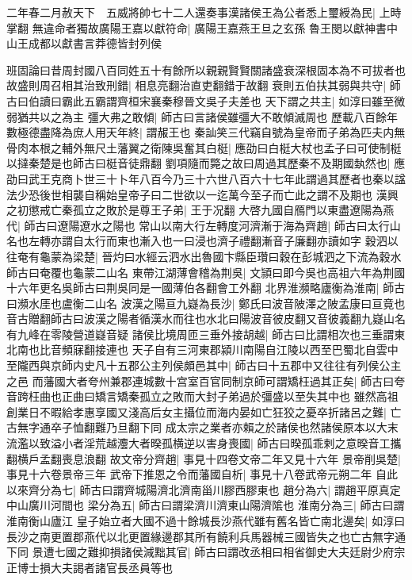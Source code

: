 二年春二月赦天下　五威將帥七十二人還奏事漢諸侯王為公者悉上璽綬為民|{
	上時掌翻}
無違命者獨故廣陽王嘉以獻符命|{
	廣陽王嘉燕王旦之玄孫}
魯王閔以獻神書中山王成都以獻書言莽德皆封列侯

班固論曰昔周封國八百同姓五十有餘所以親親賢賢關諸盛衰深根固本為不可拔者也故盛則周召相其治致刑錯|{
	相息亮翻治直吏翻錯于故翻}
衰則五伯扶其弱與共守|{
	師古曰伯讀曰霸此五霸謂齊桓宋襄秦穆晉文吳子夫差也}
天下謂之共主|{
	如淳曰雖至微弱猶共以之為主}
彊大弗之敢傾|{
	師古曰言諸侯雖彊大不敢傾滅周也}
歷載八百餘年數極德盡降為庶人用天年終|{
	謂赧王也}
秦訕笑三代竊自號為皇帝而子弟為匹夫内無骨肉本根之輔外無尺土藩翼之衛陳吳奮其白梃|{
	應劭曰白梃大杖也孟子曰可使制梃以撻秦楚是也師古曰梃音徒鼎翻}
劉項隨而斃之故曰周過其歷秦不及期國埶然也|{
	應劭曰武王克商卜世三十卜年八百今乃三十六世八百六十七年此謂過其歷者也秦以諡法少恐後世相襲自稱始皇帝子曰二世欲以一迄萬今至子而亡此之謂不及期也}
漢興之初懲戒亡秦孤立之敗於是尊王子弟|{
	王于况翻}
大啓九國自鴈門以東盡遼陽為燕代|{
	師古曰遼陽遼水之陽也}
常山以南大行左轉度河濟漸于海為齊趙|{
	師古曰太行山名也左轉亦謂自太行而東也漸入也一曰浸也濟子禮翻漸音子廉翻亦讀如字}
穀泗以往奄有龜蒙為梁楚|{
	晉灼曰水經云泗水出魯國卞縣臣瓚曰穀在彭城泗之下流為穀水師古曰奄覆也龜蒙二山名}
東帶江湖薄會稽為荆吳|{
	文頴曰即今吳也高祖六年為荆國十六年更名吳師古曰荆吳同是一國薄伯各翻會工外翻}
北界淮瀕略廬衡為淮南|{
	師古曰瀕水厓也盧衡二山名}
波漢之陽亘九嶷為長沙|{
	鄭氏曰波音陂澤之陂孟康曰亘竟也音古贈翻師古曰波漢之陽者循漢水而往也水北曰陽波音彼皮翻又音彼義翻九嶷山名有九峰在零陵營道嶷音疑}
諸侯比境周匝三垂外接胡越|{
	師古曰比謂相次也三垂謂東北南也比音頻寐翻接連也}
天子自有三河東郡潁川南陽自江陵以西至巴蜀北自雲中至隴西與京師内史凡十五郡公主列侯頗邑其中|{
	師古曰十五郡中又往往有列侯公主之邑}
而藩國大者夸州兼郡連城數十宫室百官同制京師可謂矯枉過其正矣|{
	師古曰夸音跨枉曲也正曲曰矯言矯秦孤立之敗而大封子弟過於彊盛以至失其中也}
雖然高祖創業日不暇給孝惠享國又淺高后女主攝位而海内晏如亡狂狡之憂卒折諸呂之難|{
	亡古無字通卒子恤翻難乃旦翻下同}
成太宗之業者亦賴之於諸侯也然諸侯原本以大末流濫以致溢小者淫荒越灋大者暌孤横逆以害身喪國|{
	師古曰暌孤乖剌之意暌音工攜翻横戶孟翻喪息浪翻}
故文帝分齊趙|{
	事見十四卷文帝二年又見十六年}
景帝削吳楚|{
	事見十六卷景帝三年}
武帝下推恩之令而藩國自析|{
	事見十八卷武帝元朔二年}
自此以來齊分為七|{
	師古曰謂齊城陽濟北濟南甾川膠西膠東也}
趙分為六|{
	謂趙平原真定中山廣川河間也}
梁分為五|{
	師古曰謂梁濟川濟東山陽濟隂也}
淮南分為三|{
	師古曰謂淮南衡山廬江}
皇子始立者大國不過十餘城長沙燕代雖有舊名皆亡南北邊矣|{
	如淳曰長沙之南更置郡燕代以北更置緣邊郡其所有饒利兵馬器械三國皆失之也亡古無字通下同}
景遭七國之難抑損諸侯減黜其官|{
	師古曰謂改丞相曰相省御史大夫廷尉少府宗正博士損大夫謁者諸官長丞員等也}
